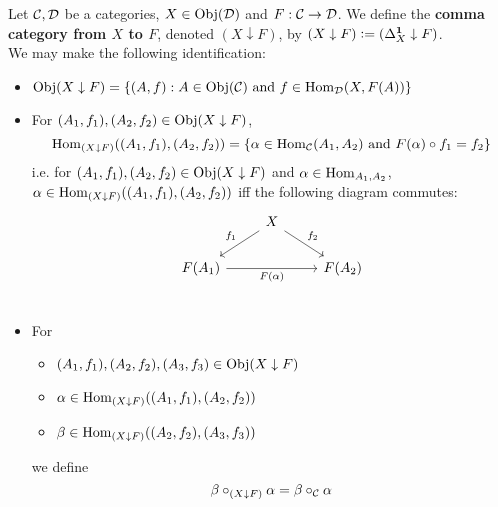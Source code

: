 \documentclass{book}
\begin{document}
	\begin{note}
	\end{note}

	\begin{defn}
		Let $\mathcal{C}, \mathcal{D}$ be a categories, $X \in \operatorname{Obj}(\mathcal{D})$ and $F: \mathcal{C} \rightarrow \mathcal{D}$. We define the \textbf{comma category from $X$ to $F$}, denoted $(X \downarrow F)$, by $(X \downarrow F) \vcentcolon= (\Delta^{\operatorname*{\mathbf{1}}}_X \downarrow F)$. \\
		We may make the following identification:
		\begin{itemize}
			\item $\operatorname{Obj}(X \downarrow F) = \{(A, f): A \in \operatorname{Obj}(\mathcal{C}) \text{ and } f \in \operatorname{Hom}_{\mathcal{D}}(X, F(A))\}$ 
			\item For $(A_1, f_1), (A_2, f_2) \in \operatorname{Obj}(X \downarrow F)$, 
			$$\operatorname{Hom}_{(X \downarrow F)}((A_1, f_1), (A_2, f_2)) = \{\alpha \in \operatorname{Hom}_{\mathcal{C}}(A_1, A_2) \text{ and } F(\alpha) \circ f_1 = f_2\}$$
			i.e. for $(A_1, f_1), (A_2, f_2) \in \operatorname{Obj}(X \downarrow F)$ and $\alpha \in \operatorname{Hom}_{A_1, A_2}$, $\alpha \in \operatorname{Hom}_{(X \downarrow F)}((A_1, f_1), (A_2, f_2))$ iff the following diagram commutes:
			\[ 
			\begin{tikzcd}
				&  X \arrow[dl, "f_1"']  \arrow[dr, "f_2"] & \\
				F(A_1)  \arrow[rr, "F(\al)"'] &&  F(A_2) \\ 
			\end{tikzcd}
			\]
			\item For 
			\begin{itemize}
				\item $(A_1, f_1), (A_2, f_2), (A_3, f_3) \in \operatorname{Obj}(X \downarrow F)$
				\item $\alpha \in \operatorname{Hom}_{(X \downarrow F)}((A_1, f_1), (A_2, f_2))$
				\item $\beta \in \operatorname{Hom}_{(X \downarrow F)}((A_2, f_2), (A_3, f_3))$
			\end{itemize}
			we define 
			$$\beta \circ_{(X \downarrow F)} \alpha = \beta \circ_{\mathcal{C}} \alpha $$
		\end{itemize}
	\end{defn}
\end{document}
